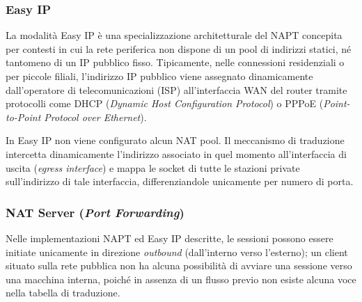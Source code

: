 \documentclass[11pt, a4paper]{article}
\begin{document}
\subsubsection{Easy IP}
La modalità Easy IP è una specializzazione architetturale del NAPT concepita per contesti in cui la rete periferica non dispone di un pool di indirizzi statici, né tantomeno di un IP pubblico fisso. Tipicamente, nelle connessioni residenziali o per piccole filiali, l'indirizzo IP pubblico viene assegnato dinamicamente dall'operatore di telecomunicazioni (ISP) all'interfaccia WAN del router tramite protocolli come DHCP (\emph{Dynamic Host Configuration Protocol}) o PPPoE (\emph{Point-to-Point Protocol over Ethernet}).


In Easy IP non viene configurato alcun NAT pool. Il meccanismo di traduzione intercetta dinamicamente l'indirizzo associato in quel momento all'interfaccia di uscita (\emph{egress interface}) e mappa le socket di tutte le stazioni private sull'indirizzo di tale interfaccia, differenziandole unicamente per numero di porta.

\subsubsection{NAT Server (\emph{Port Forwarding})}
Nelle implementazioni NAPT ed Easy IP descritte, le sessioni possono essere initiate unicamente in direzione \emph{outbound} (dall'interno verso l'esterno); un client situato sulla rete pubblica non ha alcuna possibilità di avviare una sessione verso una macchina interna, poiché in assenza di un flusso previo non esiste alcuna voce nella tabella di traduzione.

\end{document}

